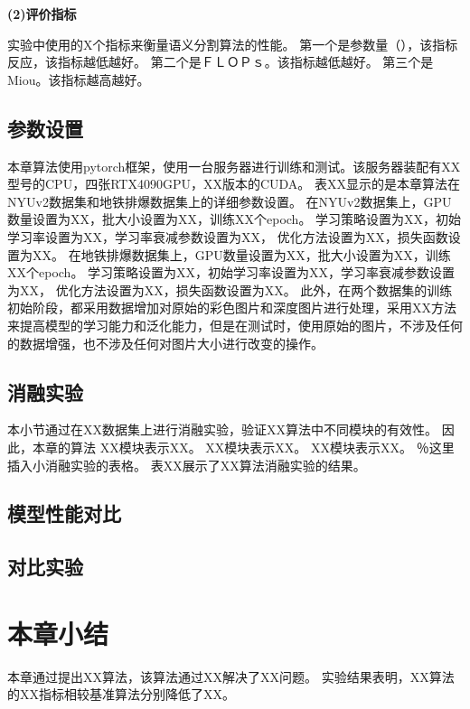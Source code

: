 \textbf{(2)评价指标}

实验中使用的X个指标来衡量语义分割算法的性能。
第一个是参数量（），该指标反应，该指标越低越好。
第二个是ＦＬＯＰｓ。该指标越低越好。
第三个是Miou。该指标越高越好。

\subsection{参数设置}
本章算法使用pytorch框架，使用一台服务器进行训练和测试。该服务器装配有XX型号的CPU，四张RTX4090GPU，XX版本的CUDA。
表XX显示的是本章算法在NYUv2数据集和地铁排爆数据集上的详细参数设置。
在NYUv2数据集上，GPU数量设置为XX，批大小设置为XX，训练XX个epoch。
学习策略设置为XX，初始学习率设置为XX，学习率衰减参数设置为XX，
优化方法设置为XX，损失函数设置为XX。
在地铁排爆数据集上，GPU数量设置为XX，批大小设置为XX，训练XX个epoch。
学习策略设置为XX，初始学习率设置为XX，学习率衰减参数设置为XX，
优化方法设置为XX，损失函数设置为XX。
此外，在两个数据集的训练初始阶段，都采用数据增加对原始的彩色图片和深度图片进行处理，采用XX方法来提高模型的学习能力和泛化能力，但是在测试时，使用原始的图片，不涉及任何的数据增强，也不涉及任何对图片大小进行改变的操作。


\subsection{消融实验}
本小节通过在XX数据集上进行消融实验，验证XX算法中不同模块的有效性。
因此，本章的算法
XX模块表示XX。
XX模块表示XX。
XX模块表示XX。
％这里插入小消融实验的表格。
表XX展示了XX算法消融实验的结果。

\subsection{模型性能对比}




\subsection{对比实验}


\section{本章小结}
本章通过提出XX算法，该算法通过XX解决了XX问题。
实验结果表明，XX算法的XX指标相较基准算法分别降低了XX。


